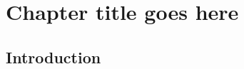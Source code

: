 \chapter{Chapter title goes here} \label{chap:chap-5}



\section{Introduction}
\blindtext \parencite{knuth-fa}
